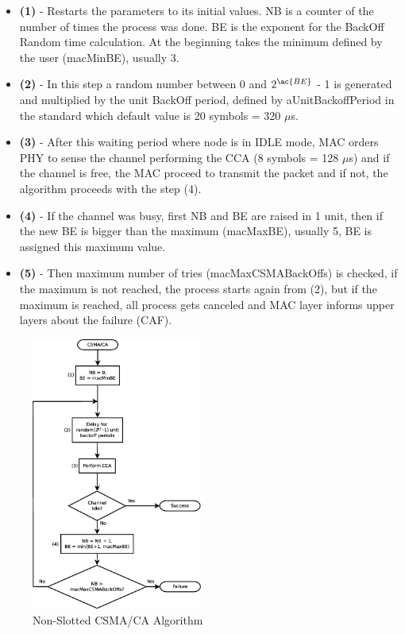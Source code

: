 \begin{itemize}
 \item \textbf{(1)} - Restarts the parameters to its initial values. \ac{NB} is a counter of the number of times the process was done. \ac{BE}
is the exponent for the BackOff Random time calculation. At the beginning takes the minimum defined by the user (macMinBE), usually 3.
 \item \textbf{(2)} - In this step a random number between 0 and $2^{\ac{BE}}$ - 1 is generated and multiplied by the unit BackOff period, defined
by aUnitBackoffPeriod in the standard which default value is 20 symbols = 320 $\mu$s.
 \item \textbf{(3)} - After this waiting period where node is in IDLE mode, \ac{MAC} orders \ac{PHY} to sense the channel performing the \ac{CCA} 
(8 symbols = 128 $\mu$s) and if the channel is free, the \ac{MAC} proceed to transmit the packet and if not, the algorithm proceeds with the 
step (4).
 \item \textbf{(4)} - If the channel was busy, first \ac{NB} and \ac{BE} are raised in 1 unit, then if the new \ac{BE} is bigger than the maximum
(macMaxBE), usually 5, \ac{BE} is assigned this maximum value.
 \item \textbf{(5)} - Then maximum number of tries (macMaxCSMABackOffs) is checked, if the maximum is not reached, the process starts again from (2),
but if the maximum is reached, all process gets canceled and \ac{MAC} layer informs upper layers about the failure (\ac{CAF}).
\end{itemize}

\begin{figure}[!ht]
 \begin{center}
  \includegraphics[width=0.5\textwidth]{CSMACA.eps}
 \end{center}
 \caption{Non-Slotted \ac{CSMA/CA} Algorithm \cite{IEEE802.15.4-2006}}
 \label{fig:CSMACA}
\end{figure}

